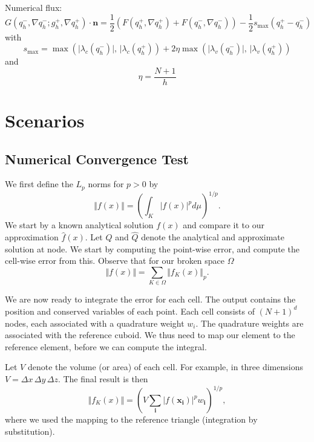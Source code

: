 Numerical flux:
\begin{equation}
  \label{eq:rusanov-flux}
  G(q_h^-, \nabla q_h^-; g_h^+, \nabla q_h^+) \cdot \bm{n} =
  \frac{1}{2} \left(
    F(q_h^+, \nabla q_h^+) +
    F(q_h^-, \nabla q_h^-)
  \right) -
  \frac{1}{2} s_\text{max} (q_h^+ - q_h^-)
\end{equation}
with
\begin{equation}
  \label{eq:parabolic-penalty}
  s_\text{max}  = \max \left(
\vert \lambda_c(q_h^-) \vert, \, \vert \lambda_c(q_h^+)
\right) +
2 \eta \max \left(
\vert \lambda_v(q_h^-) \vert, \, \vert \lambda_v(q_h^+)
\right)
\end{equation}
and
\begin{equation}
  \eta = \frac{N+1}{h}
\end{equation}

\chapter{Scenarios}\label{sec:scenarios}
\section{Numerical Convergence Test}
We first define the $L_p$ norms for $p > 0$ by
\begin{equation}
  \label{eq:Lp-nrom}
  \Vert f(x) \Vert = \left( \int_K \vert f(x) \vert^p d\mu  \right)^{1/p}.
\end{equation}
We start by a known analytical solution $f(x)$ and compare it to our approximation $\hat{f}(x)$.
Let $Q$ and $\hat{Q}$ denote the analytical and approximate solution at node.
We start by computing the point-wise error, and compute the cell-wise error from this.
Observe that for our broken space $\Omega$
\begin{equation}
  \label{eq:lp-norm-broken}
 \Vert f(x) \Vert = \sum_{K \in \Omega} \Vert f_K(x) \Vert_p.
\end{equation}

We are now ready to integrate the error for each cell.
The output contains the position and conserved variables of each point.
Each cell consists of $(N + 1)^d$ nodes, each associated with a quadrature weight $w_i$.
The quadrature weights are associated with the reference cuboid.
We thus need to map our element to the reference element, before we can compute the integral.

Let $V$ denote the volume (or area) of each cell.
For example, in three dimensions $V = \Delta x \, \Delta y \, \Delta z$.
The final result is then
\begin{equation}
  \Vert f_K(x) \Vert = \left( V \sum_{\bm{i}} \vert f(\bm{x}_{\bm{i}}) \vert^p w_{{\bm{i}}}  \right)^{1/p},
\end{equation}
where we used the mapping to the reference triangle (integration by substitution).

